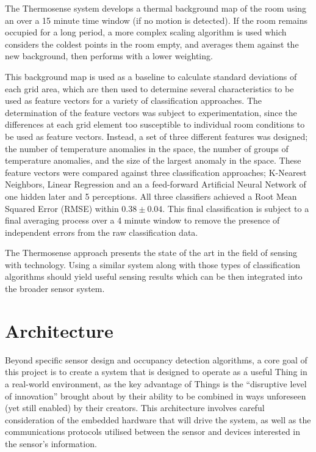 \documentclass[../thesis/thesis.tex]{subfiles}
\begin{document}
The Thermosense system develops a thermal background map of the room using an \emwa over a 15 minute time window (if no motion is detected). If the room remains occupied for a long period, a more complex scaling algorithm is used which considers the coldest points in the room empty, and averages them against the new background, then performs \emwa with a lower weighting.

This background map is used as a baseline to calculate standard deviations of each grid area, which are then used to determine several characteristics to be used as feature vectors for a variety of classification approaches. The determination of the feature vectors was subject to experimentation, since the differences at each grid element too susceptible to individual room conditions to be used as feature vectors. Instead, a set of three different features was designed; the number of temperature anomalies in the space, the number of groups of temperature anomalies, and the size of the largest anomaly in the space. These feature vectors were compared against three classification approaches; K-Nearest Neighbors, Linear Regression and an a feed-forward Artificial Neural Network of one hidden later and 5 perceptions. All three classifiers achieved a Root Mean Squared Error (RMSE) within $0.38\pm0.04$. This final classification is subject to a final averaging process over a 4 minute window to remove the presence of independent errors from the raw classification data.

The Thermosense approach presents the state of the art in the field of sensing with \iar technology. Using a similar \iar system along with those types of classification algorithms should yield useful sensing results which can be then integrated into the broader sensor system.

\section{Architecture}
\label{sec:litreview:architecture}
Beyond specific sensor design and occupancy detection algorithms, a core goal of this project is to create a system that is designed to operate as a useful Thing in a real-world \iot environment, as the key advantage of Things is the ``disruptive level of innovation''\cite{atzori2010internet} brought about by their ability to be combined in ways unforeseen (yet still enabled) by their creators. This architecture involves careful consideration of the embedded hardware that will drive the system, as well as the communications protocols utilised between the sensor and devices interested in the sensor's information.
\end{document}
